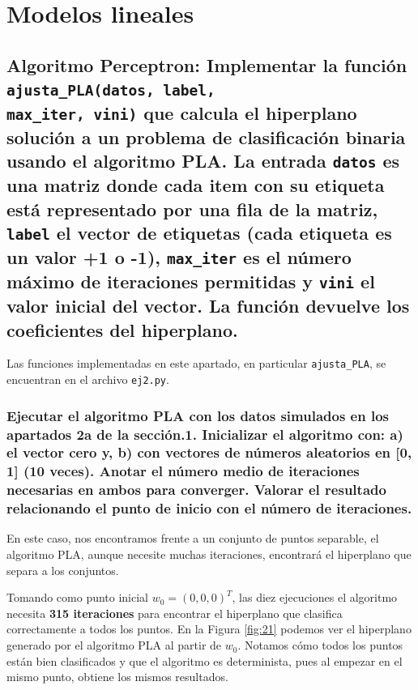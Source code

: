 \documentclass[a4paper, 20pt]{article}
\begin{document}
\section{Modelos lineales}

\subsection{\textbf{Algoritmo Perceptron}: Implementar la función \texttt{ajusta\_PLA(datos, label,\\ max\_iter, vini)} que calcula el hiperplano solución a un problema de clasificación binaria usando el algoritmo PLA. La entrada \texttt{datos} es una matriz donde cada item con su etiqueta está representado por una fila de la matriz, \texttt{label} el vector de etiquetas (cada etiqueta es un valor +1 o -1), \texttt{max\_iter} es el número máximo de iteraciones permitidas y \texttt{vini} el valor inicial del vector. La función devuelve los coeficientes del hiperplano.}

Las funciones implementadas en este apartado, en particular \texttt{ajusta\_PLA}, se encuentran en el archivo \texttt{ej2.py}.

\subsubsection{Ejecutar el algoritmo PLA con los datos simulados en los apartados 2a de la sección.1. Inicializar el algoritmo con: a) el vector cero y, b) con vectores de números aleatorios en [0, 1] (10 veces). Anotar el número medio de iteraciones necesarias en ambos para converger. Valorar el resultado relacionando el punto de inicio con el número de iteraciones.}

En este caso, nos encontramos frente a un conjunto de puntos separable, el algoritmo PLA, aunque necesite muchas iteraciones, encontrará el hiperplano que separa a los conjuntos.

Tomando como punto inicial $w_0 = (0,0,0)^T$, las diez ejecuciones el algoritmo necesita \textbf{315 iteraciones} para encontrar el hiperplano que clasifica correctamente a todos los puntos. En la Figura \ref{fig:21} podemos ver el hiperplano generado por el algoritmo PLA al partir de $w_0$. Notamos cómo todos los puntos están bien clasificados y que el algoritmo es determinista, pues al empezar en el mismo punto, obtiene los mismos resultados.
\end{document}
